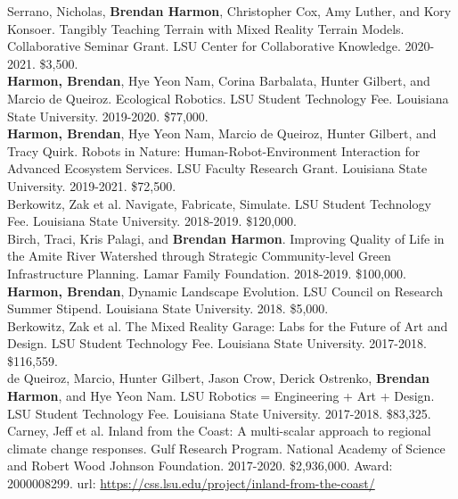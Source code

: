 \documentclass[10pt]{developercv} %
\begin{document}
Serrano, Nicholas, \textbf{Brendan Harmon}, Christopher Cox, Amy Luther, and Kory Konsoer.
Tangibly Teaching Terrain with Mixed Reality Terrain Models.
Collaborative Seminar Grant. 
LSU Center for Collaborative Knowledge.
2020-2021. \$3,500.\\

\textbf{Harmon, Brendan}, Hye Yeon Nam, Corina Barbalata, Hunter Gilbert, and Marcio de Queiroz.
Ecological Robotics.
LSU Student Technology Fee. 
Louisiana State University. 
2019-2020.	\$77,000.\\

\textbf{Harmon, Brendan}, Hye Yeon Nam, Marcio de Queiroz, Hunter Gilbert, and Tracy Quirk. 
Robots in Nature: Human-Robot-Environment Interaction for Advanced Ecosystem Services. 
LSU Faculty Research Grant. 
Louisiana State University. 
2019-2021. \$72,500.\\

Berkowitz, Zak et al. Navigate, Fabricate, Simulate. 
LSU Student Technology Fee. 
Louisiana State University. 
2018-2019.	\$120,000.\\

Birch, Traci, Kris Palagi, and \textbf{Brendan Harmon}. 
Improving Quality of Life in the Amite River Watershed through Strategic Community-level Green Infrastructure Planning. 
Lamar Family Foundation. 
2018-2019. \$100,000.\\

\textbf{Harmon, Brendan}, 
Dynamic Landscape Evolution. 
LSU Council on Research Summer Stipend. 
Louisiana State University. 
2018. \$5,000.\\

Berkowitz, Zak et al. 
The Mixed Reality Garage: Labs for the Future of Art and Design. 
LSU Student Technology Fee. 
Louisiana State University. 
2017-2018. \$116,559.\\

de Queiroz, Marcio, Hunter Gilbert, Jason Crow, Derick Ostrenko, \textbf{Brendan Harmon}, and Hye Yeon Nam. 
LSU Robotics = Engineering + Art + Design. 
LSU Student Technology Fee. 
Louisiana State University. 
2017-2018. \$83,325.\\

Carney, Jeff et al. 
Inland from the Coast: A multi-scalar approach to regional climate change responses. 
Gulf Research Program. 
National Academy of Science and Robert Wood Johnson Foundation.
2017-2020. \$2,936,000. Award: 2000008299.
url: \url{https://css.lsu.edu/project/inland-from-the-coast/}\\
\end{document}
